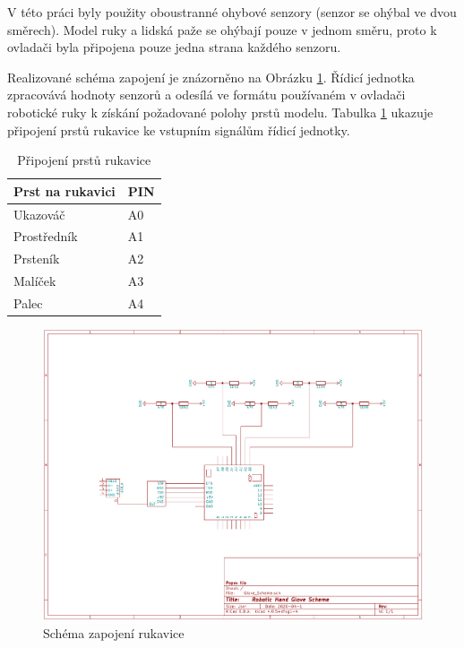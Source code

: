 \documentclass[thesis=B,czech]{FITthesis}[2012/06/26]
\begin{document}
V této práci byly použity oboustranné ohybové senzory (senzor se ohýbal ve dvou směrech). Model ruky a lidská paže se ohýbají pouze v jednom směru, proto k ovladači byla připojena pouze jedna strana každého senzoru. 

Realizované schéma zapojení je znázorněno na Obrázku \ref{fig:SchGlove}. Řídicí jednotka zpracovává hodnoty senzorů a odesílá ve formátu používaném v ovladači robotické ruky k získání požadované polohy prstů modelu. Tabulka \ref{tab:gloveConn} ukazuje připojení prstů rukavice ke vstupním signálům řídicí jednotky.


\begin{table}[H]
\centering
\begin{tabular}{|l|l|}
\hline
\textbf{Prst na rukavici} & \textbf{PIN} \\ \hline
Ukazováč                  & A0           \\ \hline
Prostředník               & A1           \\ \hline
Prsteník                  & A2           \\ \hline
Malíček                   & A3           \\ \hline
Palec                     & A4           \\ \hline
\end{tabular}
\caption{Připojení prstů rukavice}
\label{tab:gloveConn}
\end{table}



 \begin{figure}[H]
\centering
\includegraphics[scale=0.185]{./image/SchGlove.png}
\caption{Schéma zapojení rukavice}
\label{fig:SchGlove}
\end{figure} 
\end{document}
